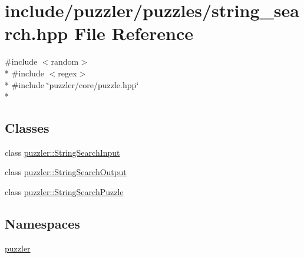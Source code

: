 \hypertarget{a00133}{}\section{include/puzzler/puzzles/string\+\_\+search.hpp File Reference}
\label{a00133}
{\ttfamily \#include $<$random$>$}\\*
{\ttfamily \#include $<$regex$>$}\\*
{\ttfamily \#include \char`\"{}puzzler/core/puzzle.\+hpp\char`\"{}}\\*
\subsection*{Classes}
\begin{DoxyCompactItemize}
\item 
class \hyperlink{a00032}{puzzler\+::\+String\+Search\+Input}
\item 
class \hyperlink{a00033}{puzzler\+::\+String\+Search\+Output}
\item 
class \hyperlink{a00035}{puzzler\+::\+String\+Search\+Puzzle}
\end{DoxyCompactItemize}
\subsection*{Namespaces}
\begin{DoxyCompactItemize}
\item 
 \hyperlink{a00145}{puzzler}
\end{DoxyCompactItemize}
